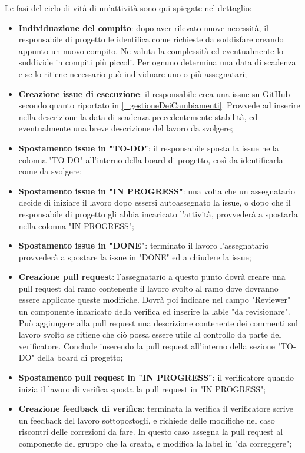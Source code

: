 Le fasi del ciclo di vità di un'attività sono qui spiegate nel dettaglio:
\begin{itemize}
    \item \textbf{Individuazione del compito}: dopo aver rilevato nuove necessità, il responsabile di progetto le identifica come richieste da soddisfare creando appunto un nuovo compito. Ne valuta la complessità ed eventualmente lo suddivide in compiti più piccoli. Per ognuno determina una data di scadenza e se lo ritiene necessario può individuare uno o più assegnatari;
    \item \textbf{Creazione issue di esecuzione}: il responsabile crea una issue su GitHub secondo quanto riportato in \ref{_gestioneDeiCambiamenti}. Provvede ad inserire nella descrizione la data di scadenza precedentemente stabilità, ed eventualmente una breve descrizione del lavoro da svolgere;
    \item \textbf{Spostamento issue in "TO-DO"}: il responsabile sposta la issue nella colonna "TO-DO" all'interno della board di progetto, così da identificarla come da svolgere;
    \item \textbf{Spostamento issue in "IN PROGRESS"}: una volta che un assegnatario decide di iniziare il lavoro dopo essersi autoassegnato la issue, o dopo che il responsabile di progetto gli abbia incaricato l'attività, provvederà a spostarla nella colonna "IN PROGRESS";
    \item \textbf{Spostamento issue in "DONE"}: terminato il lavoro l'assegnatario provvederà a spostare la issue in "DONE" ed a chiudere la issue;
    \item \textbf{Creazione pull request}: l'assegnatario a questo punto dovrà creare una pull request dal ramo contenente il lavoro svolto al ramo dove dovranno essere applicate queste modifiche. Dovrà poi indicare nel campo "Reviewer" un componente incaricato della verifica ed inserire la lable "da revisionare". Può aggiungere alla pull request una descrizione contenente dei commenti sul lavoro svolto se ritiene che ciò possa essere utile al controllo da parte del verificatore. Conclude inserendo la pull request all'interno della sezione "TO-DO" della board di progetto;
    \item \textbf{Spostamento pull request in "IN PROGRESS"}: il verificatore quando inizia il lavoro di verifica sposta la pull request in "IN PROGRESS";
    \item \textbf{Creazione feedback di verifica}: terminata la verifica il verificatore scrive un feedback del lavoro sottopostogli, e richiede delle modifiche nel caso riscontri delle correzioni da fare. In questo caso assegna la pull request al componente del gruppo che la creata, e modifica la label in "da correggere";

\end{itemize}
